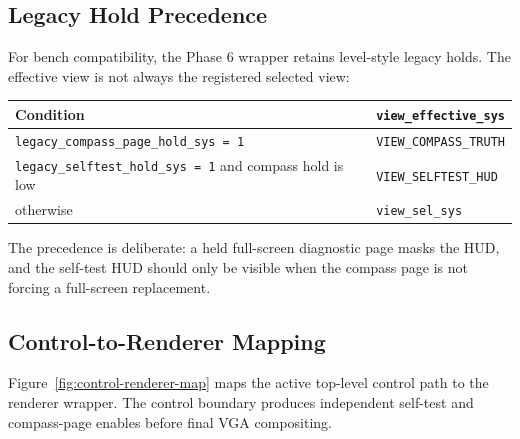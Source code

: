 \documentclass{article}
\newcommand{\sig}[1]{\begingroup\nolinkurl{#1}\endgroup}
\begin{document}
\subsection{Legacy Hold Precedence}

For bench compatibility, the Phase 6 wrapper retains level-style legacy holds.
The effective view is not always the registered selected view:

\begin{center}
\begin{tabular}{l l}
\toprule
\textbf{Condition} & \textbf{\sig{view_effective_sys}} \\
\midrule
\sig{legacy_compass_page_hold_sys = 1} & \sig{VIEW_COMPASS_TRUTH} \\
\sig{legacy_selftest_hold_sys = 1} and compass hold is low & \sig{VIEW_SELFTEST_HUD} \\
otherwise & \sig{view_sel_sys} \\
\bottomrule
\end{tabular}
\end{center}

The precedence is deliberate: a held full-screen diagnostic page masks the HUD,
and the self-test HUD should only be visible when the compass page is not
forcing a full-screen replacement.

\subsection{Control-to-Renderer Mapping}

Figure~\ref{fig:control-renderer-map} maps the active top-level control path to
the renderer wrapper.  The control boundary produces independent self-test and
compass-page enables before final VGA compositing.
\end{document}
